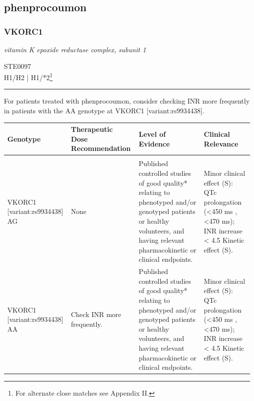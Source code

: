 \documentclass{report}
\begin{document}
      \normalsize







\subsection{ phenprocoumon }

\subsubsection{ VKORC1 }
     \textit{ vitamin K epoxide reductase complex, subunit 1 } \begin{flushright} \textsc{ STE0097 \\ H1/H2  | H1/*2\footnote{For alternate close matches see Appendix II.} }\end{flushright}
      \hrule \vspace{6pt}
      For patients treated with phenprocoumon, consider checking INR more frequently in patients with the AA genotype at VKORC1 [variant:rs9934438]. \newline
      \scriptsize
      
      \begin{tabularx}{\textwidth}{ XXXX }
      \textbf{ Genotype }&\textbf{ Therapeutic Dose Recommendation }&\textbf{ Level of Evidence }&\textbf{ Clinical Relevance } \\ \hline \\  VKORC1 [variant:rs9934438] AG & None & Published controlled studies of good quality* relating to phenotyped and/or genotyped patients or healthy volunteers, and having relevant pharmacokinetic or clinical endpoints. & Minor clinical effect (S): QTc prolongation (<450 ms , <470 ms); INR increase < 4.5 Kinetic effect (S).  \\  VKORC1 [variant:rs9934438] AA & Check INR more frequently. & Published controlled studies of good quality* relating to phenotyped and/or genotyped patients or healthy volunteers, and having relevant pharmacokinetic or clinical endpoints. & Minor clinical effect (S): QTc prolongation (<450 ms , <470 ms); INR increase < 4.5 Kinetic effect (S).  \\ 
      \end{tabularx}
      
      \normalsize
\end{document}
